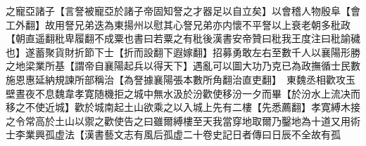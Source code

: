 之寵亞諸子【言詧被寵亞於諸子帝固知詧之才器足以自立矣】以會稽人物殷阜【會工外翻】故用詧兄弟迭為東揚州以慰其心詧兄弟亦内懷不平詧以上衰老朝多秕政【朝直遥翻秕卑履翻不成粟也書曰若粟之有秕後漢書安帝贊曰秕我王度注曰秕諭穢也】遂蓄聚貨財折節下士【折而設翻下遐嫁翻】招募勇敢左右至數千人以襄陽形勝之地梁業所基【謂帝自襄陽起兵以得天下】遇亂可以圖大功乃克已為政撫循士民數施恩惠延納規諫所部稱治【為詧據襄陽張本數所角翻治直吏翻】　東魏丞相歡攻玉壁晝夜不息魏韋孝寛随機拒之城中無水汲於汾歡使移汾一夕而畢【於汾水上流决而移之不使近城】歡於城南起土山欲乘之以入城上先有二樓【先悉薦翻】孝寛縛木接之令常高於土山以禦之歡使告之曰雖爾縛樓至天我當穿地取爾乃鑿地為十道又用術士李業興孤虚法【漢書藝文志有風后孤虚二十卷史記日者傳曰日辰不全故有孤